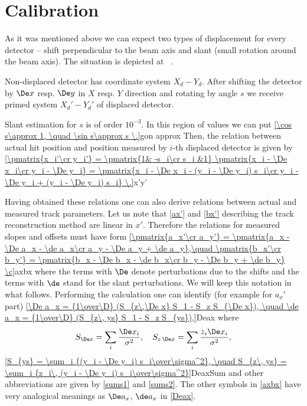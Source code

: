 \section{Calibration}

As it was mentioned above we can expect two types of displacement for every detector -- shift
perpendicular to the beam axis and slant (small rotation around the beam axis). The situation is
depicted at \fg{}~.

Non-displaced detector has coordinate system $X_d-Y_d$. After shifting the detector by $\De x$ resp.
$\De y$ in $X$ resp. $Y$ direction and rotating by angle $s$ we receive primed system $X_d'-Y_d'$ of displaced detector.

Slant estimation for $s$ is of order $10^{-3}$. In this region of values we can put
\eqref{\cos s\approx 1, \quad \sin s\approx s \.}{gon approx}
Then, the relation between actual hit position and position measured by $i$-th displaced detector is given
by
\eqref{\pmatrix{x_i'\cr y_i'} = \pmatrix{1& -s_i\cr s_i &1} \pmatrix{x_i - \De x_i\cr y_i - \De y_i} =
\pmatrix{x_i - \De x_i - (y_i - \De y_i) s_i\cr y_i - \De y_i + (y_i - \De y_i) s_i} \.}{x'y'}

Having obtained these relations one can also derive relations between actual and measured track parameters. Let us note that \equs{} \ref{ax'} and \ref{bx'} describing the track reconstruction method are linear in $x'$. Therefore the relations for measured slopes and offsets must have form
\eqref{\pmatrix{a_x'\cr a_y'} = \pmatrix{a_x - \De a_x - \de a_x\cr a_y - \De a_y + \de a_y},\quad
\pmatrix{b_x'\cr b_y'} = \pmatrix{b_x - \De b_x - \de b_x\cr b_y - \De b_y + \de b_y} \c}{axbx}
where the terms with $\De$ denote perturbations due to the shifts and the terms with $\de$ stand for the slant perturbations. We will keep this notation in what follows. Performing the calculation one can identify (for example for $a_x'$ part)
\eqref{\De a_x = {1\over\D} (S_{z\,\De x} S_1 - S_z S_{\De x}), \quad \de a_x = {1\over\D} (S_{z\, ys} S_1 - S_z S_{ys}),}{Deax}
where
$$S_{\De x} = \sum_i {\De x_i\over\sigma^2}, \quad S_{z\,\De x} = \sum_i {z_i \De x_i\over\sigma^2},$$
\eqref{S_{ys} = \sum_i {(y_i - \De y_i) s_i\over\sigma^2}, \quad S_{z\, ys} = \sum_i {z_i\, (y_i - \De y_i) s_i\over\sigma^2}}{DeaxSum}
and other abbreviations are given by \equs{} \ref{sums1} and \ref{sums2}. The other symbols
in \ref{axbx} have very analogical meanings as $\De a_x$, $\de a_x$ in \ref{Deax}.

